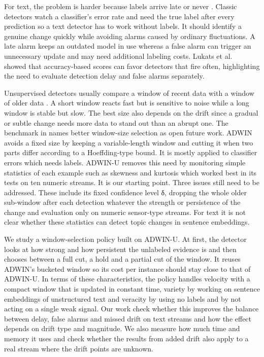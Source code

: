 \documentclass[conference]{IEEEtran}
\begin{document}
For text, the problem is harder because labels arrive late or never \cite{garcia2024review}. Classic detectors watch a classifier's error rate and need the true label after every prediction \cite{gama2004,bifet2007} so a text detector has to work without labels. It should identify a genuine change quickly while avoiding alarms caused by ordinary fluctuations. A late alarm keeps an outdated model in use whereas a false alarm can trigger an unnecessary update and may need additional labeling costs. Lukats et al.\ \cite{lukats2025} showed that accuracy-based scores can favor detectors that fire often, highlighting the need to evaluate detection delay and false alarms separately.

Unsupervised detectors usually compare a window of recent data with a window of older data \cite{hinder2024a}. A short window reacts fast but is sensitive to noise while a long window is stable but slow. The best size also depends on the drift since a gradual or subtle change needs more data to stand out than an abrupt one. The benchmark in \cite{lukats2025} names better window-size selection as open future work.
ADWIN \cite{bifet2007} avoids a fixed size by keeping a variable-length window and cutting it when two parts differ according to a Hoeffding-type bound. It is mostly applied to classifier errors which needs labels. ADWIN-U \cite{assis2025} removes this need by monitoring simple statistics of each example such as skewness and kurtosis which worked best in its tests on ten numeric streams. It is our starting point. Three issues still need to be addressed. These include its fixed confidence level δ, dropping the whole older sub-window after each detection whatever the strength or persistence of the change and evaluation only on numeric sensor-type streams. For text it is not clear whether these statistics can detect topic changes in sentence embeddings.

We study a window-selection policy built on ADWIN-U. At first, the detector looks at how strong and how persistent the unlabeled evidence is and then chooses between a full cut, a hold and a partial cut of the window. It reuses ADWIN's bucketed window so its cost per instance should stay close to that of ADWIN-U. In terms of these characteristics, the policy handles velocity with a compact window that is updated in constant time, variety by working on sentence embeddings of unstructured text and veracity by using no labels and by not acting on a single weak signal. Our work check whether this improves the balance between delay, false alarms and missed drift on text streams and how the effect depends on drift type and magnitude. We also measure how much time and memory it uses and check whether the results from added drift also apply to a real stream where the drift points are unknown.
\end{document}
